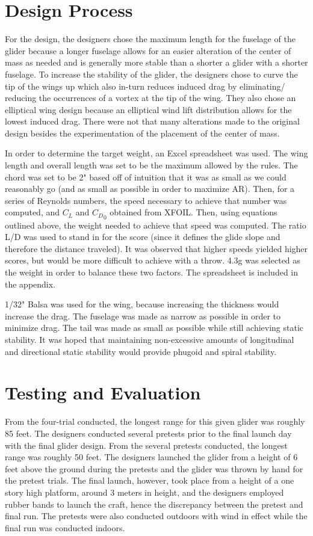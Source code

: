 \documentclass{article}
\begin{document}
\section{Design Process}
For the design, the designers chose the maximum length for the fuselage of the glider because a longer fuselage allows for an easier alteration of the center of mass as needed and is generally more stable than a shorter a glider with a shorter fuselage. To increase the stability of the glider, the designers chose to curve the tip of the wings up which also in-turn reduces induced drag by eliminating/ reducing the occurrences of a vortex at the tip of the wing. They also chose an elliptical wing design because an elliptical wind lift distribution allows for the lowest induced drag. There were not that many alterations made to the original design besides the experimentation of the placement of the center of mass. 

In order to determine the target weight, an Excel spreadsheet was used. The wing length and overall length was set to be the maximum allowed by
the rules. The chord was set to be 2" based off of intuition that it was as small as we could reasonably go (and as small as possible in order to
maximize AR). Then, for a series of Reynolds numbers, the speed necessary to achieve that number was computed, and $C_L$ and ${C_D}_0$ obtained from
XFOIL. Then, using equations outlined above, the weight needed to achieve that speed was computed. The ratio L/D was used to stand in for the score
(since it defines the glide slope and therefore the distance traveled). It was observed that higher speeds yielded higher scores, but would be
more difficult to achieve with a throw. 4.3g was selected as the weight in order to balance these two factors. The spreadsheet is included in the
appendix.

1/32" Balsa was used for the wing, because increasing the thickness would increase the drag. The fuselage was made as narrow as possible in order to
minimize drag. The tail was made as small as possible while still achieving static stability. It was hoped that maintaining non-excessive amounts
of longitudinal and directional static stability would provide phugoid and spiral stability.

\section{Testing and Evaluation}
From the four-trial conducted, the longest range for this given glider was roughly 85 feet. The designers conducted several pretests prior to the final launch day with the final glider design. From the several pretests conducted, the longest range was roughly 50 feet. The designers launched the glider from a height of 6 feet above the ground during the pretests and the glider was thrown by hand for the pretest trials. The final launch, however, took place from a height of a one story high platform, around 3 meters in height, and the designers employed rubber bands to launch the craft, hence the discrepancy between the pretest and final run. The pretests were also conducted outdoors with wind in effect while the final run was conducted indoors. 
\end{document}

